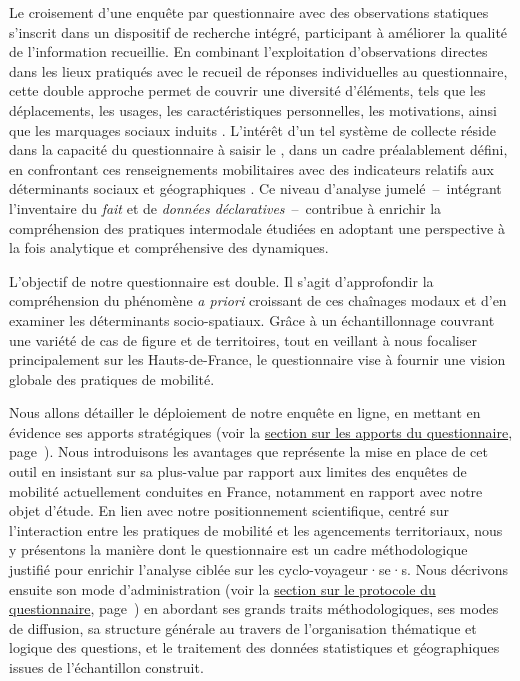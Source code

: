 \begin{refsegment}
Le croisement d’une enquête par questionnaire avec des observations statiques s’inscrit dans un dispositif de recherche intégré, participant à améliorer la qualité de l'information recueillie. En combinant l’exploitation d’observations directes dans les lieux pratiqués avec le recueil de réponses individuelles au questionnaire, cette double approche permet de couvrir une diversité d’éléments, tels que les déplacements, les usages, les caractéristiques personnelles, les motivations, ainsi que les marquages sociaux induits \textcolor{blue}{\autocite[131]{dureau_lobservation_2014}}. L’intérêt d’un tel système de collecte réside dans la capacité du questionnaire à saisir le , dans un cadre préalablement défini, en confrontant ces renseignements mobilitaires avec des indicateurs relatifs aux déterminants sociaux et géographiques \textcolor{blue}{\autocite[68]{belfils_lepreuve_2002}}. Ce niveau d’analyse jumelé~–~intégrant l'inventaire du \textsl{fait} et de \textsl{données déclaratives}~–~contribue à enrichir la compréhension des pratiques intermodale étudiées en adoptant une perspective à la fois analytique et compréhensive des dynamiques.%

L'objectif de notre questionnaire est double. Il s'agit d'approfondir la compréhension du phénomène \textsl{a priori} croissant de ces chaînages modaux et d'en examiner les déterminants socio-spatiaux. Grâce à un échantillonnage couvrant une variété de cas de figure et de territoires, tout en veillant à nous focaliser principalement sur les Hauts-de-France, le questionnaire vise à fournir une vision globale des pratiques de mobilité.%

Nous allons détailler le déploiement de notre enquête en ligne, en mettant en évidence ses apports stratégiques (voir la \hyperref[chap3:apports-questionnaire-usagers]{section sur les apports du questionnaire}, page~\pageref{chap3:apports-questionnaire-usagers}). Nous introduisons les avantages que représente la mise en place de cet outil en insistant sur sa plus-value par rapport aux limites des enquêtes de mobilité actuellement conduites en France, notamment en rapport avec notre objet d'étude. En lien avec notre positionnement scientifique, centré sur l'interaction entre les pratiques de mobilité et les agencements territoriaux, nous y présentons la manière dont le questionnaire est un cadre méthodologique justifié pour enrichir l'analyse ciblée sur les cyclo-voyageur·se·s. Nous décrivons ensuite son mode d'administration (voir la \hyperref[chap3:administration-questionnaire-usagers]{section sur le protocole du questionnaire}, page~\pageref{chap3:administration-questionnaire-usagers}) en abordant ses grands traits méthodologiques, ses modes de diffusion, sa structure générale au travers de l'organisation thématique et logique des questions, et le traitement des données statistiques et géographiques issues de l'échantillon construit.%


\end{refsegment}
